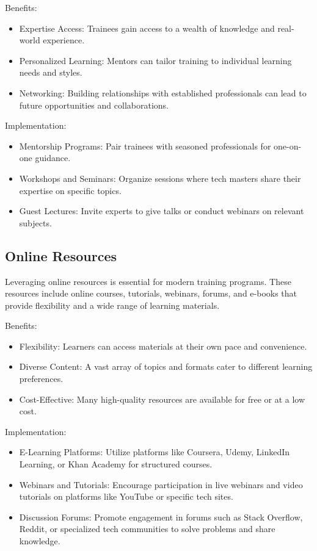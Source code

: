 Benefits:
\begin{itemize}
    

  \item  Expertise Access: Trainees gain access to a wealth of knowledge and real-world experience.
  \item Personalized Learning: Mentors can tailor training to individual learning needs and styles.
  \item Networking: Building relationships with established professionals can lead to future opportunities and collaborations.
\end{itemize}
Implementation:
\begin{itemize}
  \item   Mentorship Programs: Pair trainees with seasoned professionals for one-on-one guidance.
    \item Workshops and Seminars: Organize sessions where tech masters share their expertise on specific topics.
    \item Guest Lectures: Invite experts to give talks or conduct webinars on relevant subjects.
\end{itemize}
\subsection{Online Resources}


Leveraging online resources is essential for modern training programs. These resources include online courses, tutorials, webinars, forums, and e-books that provide flexibility and a wide range of learning materials.

Benefits:
\begin{itemize}
   \item Flexibility: Learners can access materials at their own pace and convenience.
    \item Diverse Content: A vast array of topics and formats cater to different learning preferences.
    \item Cost-Effective: Many high-quality resources are available for free or at a low cost.
\end{itemize}
Implementation:
\begin{itemize}
    \item E-Learning Platforms: Utilize platforms like Coursera, Udemy, LinkedIn Learning, or Khan Academy for structured courses.
    \item Webinars and Tutorials: Encourage participation in live webinars and video tutorials on platforms like YouTube or specific tech sites.
    \item Discussion Forums: Promote engagement in forums such as Stack Overflow, Reddit, or specialized tech communities to solve problems and share knowledge.
\end{itemize}

